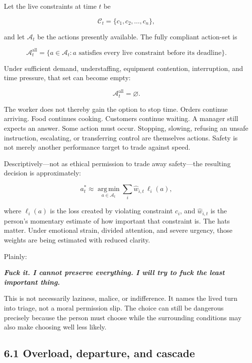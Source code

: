 \documentclass[11pt,oneside]{article}
\renewenvironment{quote}
  {\begin{tcolorbox}[
      enhanced,
      breakable,
      colback=ManifestLight,
      colframe=ManifestRule,
      boxrule=0pt,
      leftrule=3pt,
      arc=0pt,
      outer arc=0pt,
      left=10pt,right=10pt,top=8pt,bottom=8pt,
      before skip=0.8em,after skip=0.8em
    ]\itshape}
  {\end{tcolorbox}}
\begin{document}
Let the live constraints at time \(t\) be

\[
\mathcal C_t = \{c_1,c_2,\ldots,c_n\},
\]

and let \(\mathcal A_t\) be the actions presently available. The fully
compliant action-set is

\[
\mathcal A_t^{\mathrm{all}}
=
\{a\in\mathcal A_t : a\text{ satisfies every live constraint before its deadline}\}.
\]

Under sufficient demand, understaffing, equipment contention,
interruption, and time pressure, that set can become empty:

\[
\mathcal A_t^{\mathrm{all}}=\varnothing.
\]

The worker does not thereby gain the option to stop time. Orders
continue arriving. Food continues cooking. Customers continue waiting. A
manager still expects an answer. Some action must occur. Stopping,
slowing, refusing an unsafe instruction, escalating, or transferring
control are themselves actions. Safety is not merely another performance
target to trade against speed.

Descriptively---not as ethical permission to trade away safety---the
resulting decision is approximately:

\[
a_t^*
\approx
\operatorname*{arg\,min}_{a\in\mathcal A_t}
\sum_i \widehat w_{i,t}\,\ell_i(a),
\]

where \(\ell_i(a)\) is the loss created by violating constraint \(c_i\),
and \(\widehat w_{i,t}\) is the person's momentary estimate of how
important that constraint is. The hats matter. Under emotional strain,
divided attention, and severe urgency, those weights are being estimated
with reduced clarity.

Plainly:

\begin{quote}
\textbf{Fuck it. I cannot preserve everything. I will try to fuck the
least important thing.}
\end{quote}

This is not necessarily laziness, malice, or indifference. It names the
lived turn into triage, not a moral permission slip. The choice can
still be dangerous precisely because the person must choose while the
surrounding conditions may also make choosing well less likely.

\hypertarget{overload-departure-and-cascade}{%
\subsection{6.1 Overload, departure, and
cascade}\label{overload-departure-and-cascade}}
\end{document}
